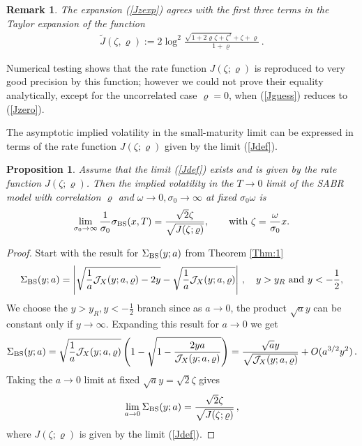\documentclass[11pt]{article}
\numberwithin{equation}{section}
\theoremstyle{plain}
\newtheorem{proposition}[theorem]{Proposition}
\newtheorem{remark}[theorem]{Remark}
\begin{document}
\begin{remark}
The expansion (\ref{Jzexp}) agrees with the first three terms in the
Taylor expansion of the function 
\begin{eqnarray}\label{Jguess} 
\tilde J(\zeta,\varrho):= 
2\log^2 
\frac{\sqrt{1 + 2\varrho \zeta + \zeta^2} + \zeta + \varrho}{1+\varrho}\,.
\end{eqnarray}
\end{remark}

Numerical testing shows that the rate function $J(\zeta;\varrho)$ is
reproduced to very good precision by this function; however we could not
prove their equality analytically, except for the uncorrelated case $\varrho=0$,
when (\ref{Jguess}) reduces to (\ref{Jzero}). 


The asymptotic implied volatility in the small-maturity limit can be expressed
in terms of the rate function $J(\zeta;\varrho)$ given by the limit (\ref{Jdef}).

\begin{proposition}
Assume that the limit (\ref{Jdef}) exists and is given by the rate function
$J(\zeta;\varrho)$. 
Then the implied volatility in the $T\to 0$ limit of the SABR model with 
correlation
$\varrho$ and $\omega\to 0,\sigma_0 \to \infty$ at fixed $\sigma_0\omega$ is
\begin{equation}\label{limSigBS}
\lim_{\sigma_0 \to \infty} \frac{1}{\sigma_0}
\sigma_{\rm BS}(x,T) = \frac{\sqrt{2} \zeta}{\sqrt{J(\zeta;\varrho)}},
\qquad\text{with $\zeta = \frac{\omega}{\sigma_0} x$}.
\end{equation}
\end{proposition}

\begin{proof}
Start with the result for $\Sigma_{\rm BS}(y;a)$ 
from Theorem \ref{Thm:1}
\begin{equation}
\Sigma_{\rm BS}(y;a) = \left| \sqrt{\frac{1}{a} \mathcal{J}_X(y;a,\varrho) -2y } -
\sqrt{\frac{1}{a} \mathcal{J}_X(y;a,\varrho) } \right| \,,\quad
y > y_R \mbox{ and } y<-\frac12,
\end{equation}
We choose the $y > y_R, y<-\frac12 $ branch since as $a\to 0$, the product
$\sqrt{a} y$ can be constant only if $y\to \infty$.
Expanding this result for $a\to 0$ we get 
\begin{equation*}
\Sigma_{\rm BS}(y;a)= 
\sqrt{\frac{1}{a} \mathcal{J}_X(y;a,\varrho) }
\left( 1 - \sqrt{1 - \frac{2y a }{\mathcal{J}_X(y;a,\varrho)}}  \right) 
= \frac{\sqrt{a} y}{\sqrt{ \mathcal{J}_X(y;a,\varrho)}} + O(a^{3/2} y^2) \nonumber \,.
\end{equation*}
Taking the $a\to 0$ limit at fixed $\sqrt{a} y = \sqrt2 \zeta$ gives
\begin{equation}
\lim_{a\to 0} \Sigma_{\rm BS}(y;a) =
\frac{\sqrt2 \zeta}{\sqrt{J(\zeta;\varrho)}}\,,
\end{equation}
where $J(\zeta;\varrho)$ is given by the limit (\ref{Jdef}).


\end{proof}
\end{document}
